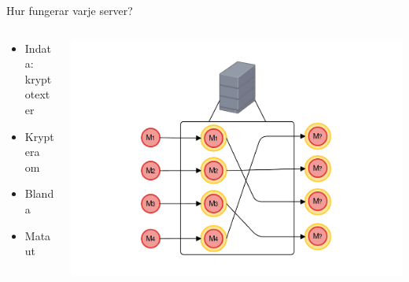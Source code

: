 \begin{frame}{Hur fungerar varje server?}

\begin{columns}
    \begin{column}{0.4\textwidth}
        \begin{itemize}
        	\item Indata: kryptotexter
        	\item Kryptera om
        	\item Blanda
        	\item Mata ut
        \end{itemize}
    \end{column}
	\begin{column}{0.6\textwidth}
    	\includegraphics[width=\textwidth]{images/mix4.pdf}
	\end{column}
\end{columns}


\end{frame}

